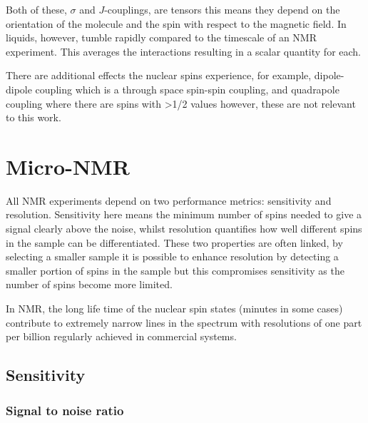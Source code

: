 Both of these, $\sigma$ and $J$-couplings, are tensors this means they depend on the orientation of the molecule
and the spin with respect to the magnetic field. In liquids, however, tumble rapidly compared to the timescale
of an NMR experiment. This averages the interactions resulting in a scalar quantity for each.

There are additional effects the nuclear spins experience, for example, dipole-dipole coupling which
is a through space spin-spin coupling, and quadrapole coupling where there are spins with >1/2 values
however, these are not relevant to this work.

\newpage

\section{Micro-NMR}\label{Micro-NMR}

All NMR experiments depend on two performance metrics: sensitivity and resolution. Sensitivity
here means the minimum number of spins needed to give a signal clearly above the noise, whilst resolution
quantifies how well different spins in the sample can be differentiated. These two properties
are often linked, by selecting a smaller sample it is possible to enhance resolution by detecting
a smaller portion of spins in the sample but this compromises sensitivity as the number of spins become more limited.

 In NMR, the long life time of the nuclear spin states (minutes in some cases) contribute to extremely
 narrow lines in the spectrum with resolutions of one part per billion regularly achieved in
 commercial systems.

 \subsection{Sensitivity}

 \subsubsection{Signal to noise ratio}


